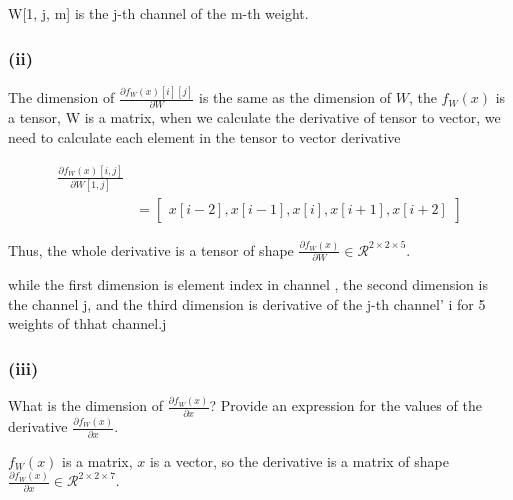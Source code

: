 \begin{enumerate}[(a)]
W[1, j, m] is the j-th channel of the m-th weight. 



\subsubsection*{(ii)}
The dimension of $\frac{\partial f_{W}(x)[i][j]}{\partial W}$ is the same as the dimension of $W$, the $f_W(x)$ is a tensor, W is a matrix, when we calculate the derivative of tensor to vector, we need to calculate each element in the tensor to vector derivative




\begin{align}
    \frac{\partial f_{W}(x)[i,j]}{\partial W[1,j]} \\
    &=\begin{bmatrix}
        x[i-2], x[i-1], x[i], x[i+1], x[i+2]
    \end{bmatrix}
\end{align}


Thus, the whole derivative is a tensor of shape $\frac {\partial f_W(x)}{\partial W} \in \mathcal{R} ^ {2 \times 2 \times 5}$.

while the first dimension is element index in channel , the second dimension is the channel j, and the third dimension is derivative of the j-th channel' i for 5 weights of thhat channel.j





\subsubsection*{(iii)}
What is the dimension of $\frac {\partial f_W(x)}{\partial x}$? Provide an expression for the values of the derivative $\frac {\partial f_W(x)}{\partial x}$. 




$f_{W}(x)$ is a matrix, $x$ is a vector, so the derivative is a matrix of shape $\frac{\partial f_{W}(x)}{\partial x} \in \mathcal{R} ^ {2 \times 2 \times 7}$.



\end{enumerate}
